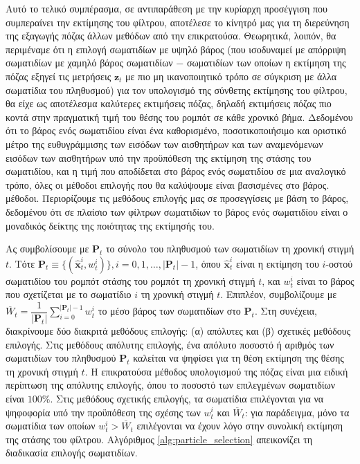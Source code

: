 Αυτό το τελικό συμπέρασμα, σε αντιπαράθεση με την κυρίαρχη προσέγγιση που συμπεραίνει την
εκτίμησης του φίλτρου, αποτέλεσε το κίνητρό μας για τη διερεύνηση της εξαγωγής πόζας
άλλων μεθόδων από την επικρατούσα. Θεωρητικά, λοιπόν, θα περιμέναμε ότι
η επιλογή σωματιδίων με υψηλό βάρος (που ισοδυναμεί με απόρριψη σωματιδίων με χαμηλό βάρος
σωματιδίων $-$ σωματιδίων των οποίων η εκτίμηση της πόζας εξηγεί τις μετρήσεις $\bm{z}_t$
με πιο μη ικανοποιητικό τρόπο σε σύγκριση με άλλα σωματίδια του πληθυσμού)
για τον υπολογισμό της σύνθετης εκτίμησης του φίλτρου, θα είχε ως αποτέλεσμα
καλύτερες εκτιμήσεις πόζας, δηλαδή εκτιμήσεις πόζας πιο κοντά στην πραγματική τιμή του
θέσης του ρομπότ σε κάθε χρονικό βήμα.
Δεδομένου ότι το βάρος ενός σωματιδίου είναι ένα καθορισμένο, ποσοτικοποιήσιμο και οριστικό μέτρο
της ευθυγράμμισης των εισόδων των αισθητήρων και των αναμενόμενων εισόδων των αισθητήρων υπό την προϋπόθεση της
εκτίμηση της στάσης του σωματιδίου, και η τιμή που αποδίδεται στο βάρος ενός σωματιδίου σε μια
αναλογικό τρόπο, όλες οι μέθοδοι επιλογής που θα καλύψουμε είναι βασισμένες στο βάρος.
μέθοδοι. Περιορίζουμε τις μεθόδους επιλογής μας σε προσεγγίσεις με βάση το βάρος, δεδομένου ότι σε
πλαίσιο των φίλτρων σωματιδίων το βάρος ενός σωματιδίου είναι ο μοναδικός δείκτης
της ποιότητας της εκτίμησής του.

Ας συμβολίσουμε με $\bm{P}_t$ το σύνολο του πληθυσμού των σωματιδίων τη χρονική στιγμή
$t$. Τότε
$\bm{P}_t \equiv \{(\hat{\bm{x}}_t^i, w_t^i)\}, i = 0,1,\dots,|\bm{P}_t|-1$,
όπου $\hat{\bm{x}}_t^i$ είναι η εκτίμηση του $i$-οστού σωματιδίου του ρομπότ
στάσης του ρομπότ τη χρονική στιγμή $t$, και $w_t^i$ είναι το βάρος που σχετίζεται με το σωματίδιο $i$ τη χρονική στιγμή
$t$. Επιπλέον, συμβολίζουμε με
$\overline{W}_t = \dfrac{1}{|\bm{P}_t|}\sum\limits_{i=0}^{|\bm{P}_t|-1} w_t^i$
το μέσο βάρος των σωματιδίων στο $\bm{P}_t$. Στη συνέχεια, διακρίνουμε δύο διακριτά
μεθόδους επιλογής: (α) απόλυτες και (β) σχετικές μεθόδους επιλογής.
Στις μεθόδους απόλυτης επιλογής, ένα απόλυτο ποσοστό ή αριθμός
των σωματιδίων του πληθυσμού $\bm{P}_t$ καλείται να ψηφίσει για τη θέση
εκτίμηση της θέσης τη χρονική στιγμή $t$. Η επικρατούσα μέθοδος υπολογισμού της πόζας είναι μια ειδική περίπτωση
της απόλυτης επιλογής, όπου το ποσοστό των επιλεγμένων σωματιδίων είναι
$100\%$. Στις μεθόδους σχετικής επιλογής, τα σωματίδια επιλέγονται για να
ψηφοφορία υπό την προϋπόθεση της σχέσης των $w_t^i$ και $\overline{W}_t$: για παράδειγμα,
μόνο τα σωματίδια των οποίων $w_t^i > \overline{W}_t$ επιλέγονται να έχουν λόγο στην
συνολική εκτίμηση της στάσης του φίλτρου. Αλγόριθμος \ref{alg:particle_selection}
απεικονίζει τη διαδικασία επιλογής σωματιδίων.

